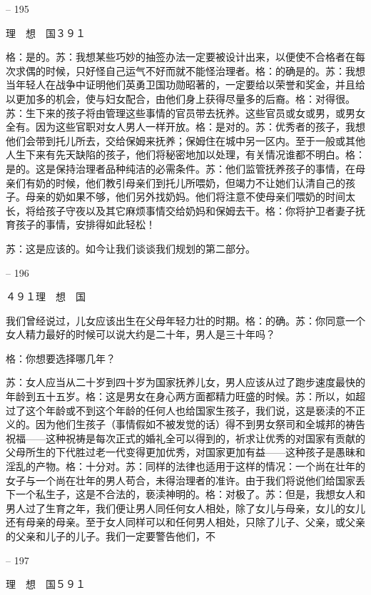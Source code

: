 \documentclass[11pt,oneside]{book}
\begin{document}
\begin{common-format}
    

-- 195

    理　想　国３９１

    格：是的。苏：我想某些巧妙的抽签办法一定要被设计出来，以便使不合格者在每次求偶的时候，只好怪自己运气不好而就不能怪治理者。格：的确是的。苏：我想当年轻人在战争中证明他们英勇卫国功勋昭著的，一定要给以荣誉和奖金，并且给以更加多的机会，使与妇女配合，由他们身上获得尽量多的后裔。格：对得很。苏：生下来的孩子将由管理这些事情的官员带去抚养。这些官员或女或男，或男女全有。因为这些官职对女人男人一样开放。格：是对的。苏：优秀者的孩子，我想他们会带到托儿所去，交给保姆来抚养；保姆住在城中另一区内。至于一般或其他人生下来有先天缺陷的孩子，他们将秘密地加以处理，有关情况谁都不明白。格：是的。这是保持治理者品种纯洁的必需条件。苏：他们监管抚养孩子的事情，在母亲们有奶的时候，他们教引母亲们到托儿所喂奶，但竭力不让她们认清自己的孩子。母亲的奶如果不够，他们另外找奶妈。他们将注意不使母亲们喂奶的时间太长，将给孩子守夜以及其它麻烦事情交给奶妈和保姆去干。格：你将护卫者妻子抚育孩子的事情，安排得如此轻松！

    苏：这是应该的。如今让我们谈谈我们规划的第二部分。

    

-- 196

    ４９１理　想　国

    我们曾经说过，儿女应该出生在父母年轻力壮的时期。格：的确。苏：你同意一个女人精力最好的时候可以说大约是二十年，男人是三十年吗？

    格：你想要选择哪几年？

    苏：女人应当从二十岁到四十岁为国家抚养儿女，男人应该从过了跑步速度最快的年龄到五十五岁。格：这是男女在身心两方面都精力旺盛的时候。苏：所以，如超过了这个年龄或不到这个年龄的任何人也给国家生孩子，我们说，这是亵渎的不正义的。因为他们生孩子（事情假如不被发觉的话）得不到男女祭司和全城邦的祷告祝福——这种祝祷是每次正式的婚礼全可以得到的，祈求让优秀的对国家有贡献的父母所生的下代胜过老一代变得更加优秀，对国家更加有益——这种孩子是愚昧和淫乱的产物。格：十分对。苏：同样的法律也适用于这样的情况：一个尚在壮年的女子与一个尚在壮年的男人苟合，未得治理者的准许。由于我们将说他们给国家丢下一个私生子，这是不合法的，亵渎神明的。格：对极了。苏：但是，我想女人和男人过了生育之年，我们便让男人同任何女人相处，除了女儿与母亲，女儿的女儿还有母亲的母亲。至于女人同样可以和任何男人相处，只除了儿子、父亲，或父亲的父亲和儿子的儿子。我们一定要警告他们，不

    

-- 197

    理　想　国５９１


\end{common-format}
\end{document}
